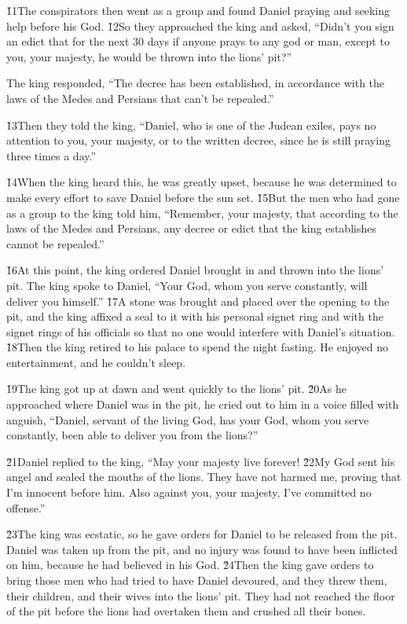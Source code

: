 \v{11}The conspirators then went as a group and found Daniel praying and seeking help before his God. \v{12}So they approached the king and asked, ``Didn't you sign an edict that for the next 30 days if anyone prays to any god or man, except to you, your majesty, he would be thrown into the lions' pit?''

The king responded, ``The decree has been established, in accordance with the laws of the Medes and Persians that can't be repealed.''

\v{13}Then they told the king, ``Daniel, who is one of the Judean exiles, pays no attention to you, your majesty, or to the written decree, since he is still praying three times a day.''

\v{14}When the king heard this, he was greatly upset, because he was determined to make every effort to save Daniel before the sun set. \v{15}But the men who had gone as a group to the king told him, ``Remember, your majesty, that according to the laws of the Medes and Persians, any decree or edict that the king establishes cannot be repealed.''

\v{16}At this point, the king ordered Daniel brought in and thrown into the lions' pit. The king spoke to Daniel, ``Your God, whom you serve constantly, will deliver you himself.'' \v{17}A stone was brought and placed over the opening to the pit, and the king affixed a seal to it with his personal signet ring and with the signet rings of his officials so that no one would interfere with Daniel's situation. \v{18}Then the king retired to his palace to spend the night fasting. He enjoyed no entertainment, and he couldn't sleep.

\v{19}The king got up at dawn and went quickly to the lions' pit. \v{20}As he approached where Daniel was in the pit, he cried out to him in a voice filled with anguish, ``Daniel, servant of the living God, has your God, whom you serve constantly, been able to deliver you from the lions?''

\v{21}Daniel replied to the king, ``May your majesty live forever! \v{22}My God sent his angel and sealed the mouths of the lions. They have not harmed me, proving that I'm innocent before him. Also against you, your majesty, I've committed no offense.''

\v{23}The king was ecstatic, so he gave orders for Daniel to be released from the pit. Daniel was taken up from the pit, and no injury was found to have been inflicted on him, because he had believed in his God. \v{24}Then the king gave orders to bring those men who had tried to have Daniel devoured, and they threw them, their children, and their wives into the lions' pit. They had not reached the floor of the pit before the lions had overtaken them and crushed all their bones.

